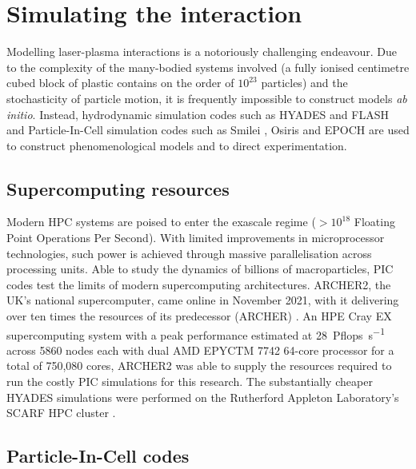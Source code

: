 
\section{Simulating the interaction}
Modelling laser-plasma interactions is a notoriously challenging endeavour. Due to the complexity of the many-bodied systems involved (a fully ionised centimetre cubed block of plastic contains on the order of $10^23$ particles) and the stochasticity of particle motion, it is frequently impossible to construct models \textit{ab initio}. Instead, hydrodynamic simulation codes such as HYADES \cite{larsenHYADESPlasmaHydrodynamics1994} and FLASH \cite{fryxellFLASHAdaptiveMesh2000} and Particle-In-Cell simulation codes such as Smilei \cite{derouillatSmileiCollaborativeOpensource2018}, Osiris \cite{fonsecaOSIRISThreeDimensionalFully2002} and EPOCH \cite{bennett2017users} are used to construct phenomenological models and to direct experimentation. 

\subsection{Supercomputing resources}\label{sec:intro-archer}
Modern \ac{HPC} systems are poised to enter the exascale regime ($> 10^{18}$ Floating Point Operations Per Second). With limited improvements in microprocessor technologies, such power is achieved through massive parallelisation across processing units. Able to study the dynamics of billions of macroparticles, PIC codes test the limits of modern supercomputing architectures. ARCHER2, the UK's national supercomputer, came online in November 2021, with it delivering over ten times the resources of its predecessor (ARCHER) \cite{ARCHER2}. An HPE Cray EX supercomputing system with a peak performance estimated at \qty{28}{Pflops.s^{-1}} across 5860 nodes each with dual AMD EPYCTM 7742 64-core processor for a total of 750,080 cores, ARCHER2 was able to supply the resources required to run the costly PIC simulations for this research. The substantially cheaper HYADES simulations were performed on the Rutherford Appleton Laboratory's SCARF \ac{HPC} cluster \cite{SCARFOverview}.

\subsection{Particle-In-Cell codes}

